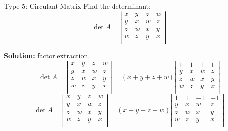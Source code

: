 \documentclass{beamer}
\begin{document}
\begin{frame}{Type 5: Circulant Matrix}
Find the determinant:
\begin{equation*}
    \det A=\left| \begin{matrix}
        x&		y&		z&		w\\
        y&		x&		w&		z\\
        z&		w&		x&		y\\
        w&		z&		y&		x\\
    \end{matrix} \right|
\end{equation*}

\textbf{Solution:} factor extraction.
\begin{equation*}
    \det A=\left| \begin{matrix}
        x&		y&		z&		w\\
        y&		x&		w&		z\\
        z&		w&		x&		y\\
        w&		z&		y&		x\\
    \end{matrix} \right|=\left( x+y+z+w \right) \left| \begin{matrix}
        1&		1&		1&		1\\
        y&		x&		w&		z\\
        z&		w&		x&		y\\
        w&		z&		y&		x\\
    \end{matrix} \right|
\end{equation*}
\begin{equation*}
    \det A=\left| \begin{matrix}
        x&		y&		z&		w\\
        y&		x&		w&		z\\
        z&		w&		x&		y\\
        w&		z&		y&		x\\
    \end{matrix} \right|=\left( x+y-z-w \right) \left| \begin{matrix}
        1&		1&		-1&		-1\\
        y&		x&		w&		z\\
        z&		w&		x&		y\\
        w&		z&		y&		x\\
    \end{matrix} \right|
\end{equation*}
\end{frame}
\end{document}
